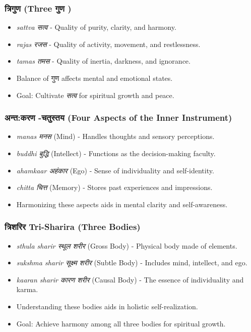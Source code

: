 \begin{frame}[fragile]\frametitle{त्रिगुण  (Three गुण )}

      \begin{itemize}
		\item \textit{sattva सत्व } - Quality of purity, clarity, and harmony.
		\item \textit{rajas रजस } - Quality of activity, movement, and restlessness.
		\item \textit{tamas तमस } - Quality of inertia, darkness, and ignorance.
		\item Balance of गुण  affects mental and emotional states.
		\item Goal: Cultivate \textit{सत्व} for spiritual growth and peace.
	  \end{itemize}

\end{frame}

\begin{frame}[fragile]\frametitle{अन्त:करण -चतुस्तय  (Four Aspects of the Inner Instrument)}

      \begin{itemize}
		\item \textit{manas मनस } (Mind) - Handles thoughts and sensory perceptions.
		\item \textit{buddhi बुद्धि } (Intellect) - Functions as the decision-making faculty.
		\item \textit{ahamkaar अहंकार } (Ego) - Sense of individuality and self-identity.
		\item \textit{chitta चित्त } (Memory) - Stores past experiences and impressions.
		\item Harmonizing these aspects aids in mental clarity and self-awareness.
	  \end{itemize}

\end{frame}

\begin{frame}[fragile]\frametitle{त्रिशरिर  Tri-Sharira (Three Bodies)}

      \begin{itemize}
		\item \textit{sthula sharir स्थूल  शरीर } (Gross Body) - Physical body made of elements.
		\item \textit{sukshma sharir सूक्ष्म  शरीर } (Subtle Body) - Includes mind, intellect, and ego.
		\item \textit{kaaran sharir कारण  शरीर } (Causal Body) - The essence of individuality and karma.
		\item Understanding these bodies aids in holistic self-realization.
		\item Goal: Achieve harmony among all three bodies for spiritual growth.
	  \end{itemize}

\end{frame}

